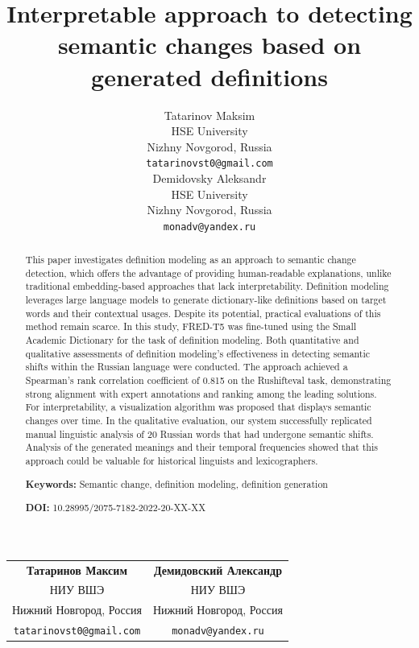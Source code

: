 \documentclass[11pt]{article}
\title{Interpretable approach to detecting semantic changes based on generated definitions}
\author{ Tatarinov Maksim \\
   HSE University \\
   Nizhny Novgorod, Russia \\
  {\tt tatarinovst0@gmail.com} \\\And
   Demidovsky Aleksandr \\
 HSE University \\
   Nizhny Novgorod, Russia \\
  {\tt monadv@yandex.ru} \\
}
\date{}
\begin{document}
\maketitle
\begin{abstract}
This paper investigates definition modeling as an approach to semantic change detection,
which offers the advantage of providing human-readable explanations, unlike traditional embedding-based approaches that lack interpretability.
Definition modeling leverages large language models to generate dictionary-like definitions based on target words and their contextual usages.
Despite its potential, practical evaluations of this method remain scarce.
In this study, FRED-T5 was fine-tuned using the Small Academic Dictionary for the task of definition modeling.
Both quantitative and qualitative assessments of definition modeling's effectiveness in detecting semantic shifts within the Russian language were conducted.
The approach achieved a Spearman's rank correlation coefficient of 0.815 on the Rushifteval task, demonstrating strong alignment with expert annotations and ranking among the leading solutions.
For interpretability, a visualization algorithm was proposed that displays semantic changes over time.
In the qualitative evaluation, our system successfully replicated manual linguistic analysis of 20 Russian words that had undergone semantic shifts.
Analysis of the generated meanings and their temporal frequencies showed that this approach could be valuable for historical linguists and lexicographers.

  \textbf{Keywords:} Semantic change, definition modeling, definition generation

  \textbf{DOI:} 10.28995/2075-7182-2022-20-XX-XX
\end{abstract}

\begin{center}

  \medskip \setlength\tabcolsep{2cm}
  \begin{tabular}{cc}
    \textbf{Татаринов Максим} & \textbf{Демидовский Александр}\\
      НИУ ВШЭ & НИУ ВШЭ\\
      Нижний Новгород, Россия & Нижний Новгород, Россия \\
      {\tt tatarinovst0@gmail.com} & {\tt monadv@yandex.ru}
  \end{tabular}
  \medskip
\end{center}
\end{document}
